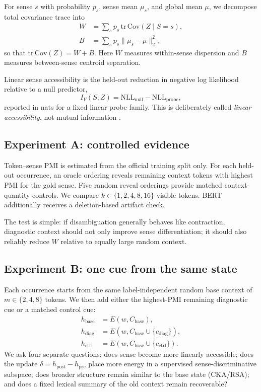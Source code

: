 \documentclass[10pt,twocolumn]{article}
\begin{document}
For sense $s$ with probability $p_s$, sense mean $\mu_s$, and global mean $\mu$, we decompose total covariance trace into
\begin{align}
W&=\sum_s p_s\,\mathrm{tr}\,\mathrm{Cov}(Z\mid S=s),\\
B&=\sum_s p_s\lVert\mu_s-\mu\rVert_2^2,
\end{align}
so that $\mathrm{tr}\,\mathrm{Cov}(Z)=W+B$. Here $W$ measures within-sense dispersion and $B$ measures between-sense centroid separation.

Linear sense accessibility is the held-out reduction in negative log likelihood relative to a null predictor,
\begin{equation}
I_V(S;Z)=\mathrm{NLL}_{\mathrm{null}}-\mathrm{NLL}_{\mathrm{probe}},
\end{equation}
reported in nats for a fixed linear probe family. This is deliberately called \emph{linear accessibility}, not mutual information \cite{hewitt2019}.

\subsection{Experiment A: controlled evidence}
Token--sense PMI is estimated from the official training split only. For each held-out occurrence, an oracle ordering reveals remaining context tokens with highest PMI for the gold sense. Five random reveal orderings provide matched context-quantity controls. We compare $k\in\{1,2,4,8,16\}$ visible tokens. BERT additionally receives a deletion-based artifact check.

The test is simple: if disambiguation generally behaves like contraction, diagnostic context should not only improve sense differentiation; it should also reliably reduce $W$ relative to equally large random context.

\subsection{Experiment B: one cue from the same state}
Each occurrence starts from the same label-independent random base context of $m\in\{2,4,8\}$ tokens. We then add either the highest-PMI remaining diagnostic cue or a matched control cue:
\begin{align}
h_{\text{base}}&=E(w,C_{\text{base}}),\\
h_{\text{diag}}&=E(w,C_{\text{base}}\cup\{c_{\text{diag}}\}),\\
h_{\text{ctrl}}&=E(w,C_{\text{base}}\cup\{c_{\text{ctrl}}\}).
\end{align}
We ask four separate questions: does sense become more linearly accessible; does the update $\delta=h_{\text{post}}-h_{\text{pre}}$ place more energy in a supervised sense-discriminative subspace; does broader structure remain similar to the base state (CKA/RSA); and does a fixed lexical summary of the old context remain recoverable?
\end{document}
